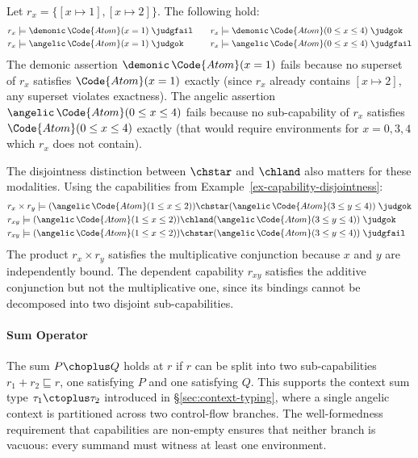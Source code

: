 \begin{example}\label{ex-approximation-modalities}
  Let $r_x = \{[x \mapsto 1], [x \mapsto 2]\}$.  The following hold:
  \begin{align*}
    &r_x \models \demonic\,\Code{Atom}(x = 1) \;\judgfail \quad
    &&r_x \models \demonic\,\Code{Atom}(0 \leq x \leq 4) \;\judgok \\
    &r_x \models \angelic\,\Code{Atom}(x = 1) \;\judgok \quad
    &&r_x \models \angelic\,\Code{Atom}(0 \leq x \leq 4) \;\judgfail
  \end{align*}
  The demonic assertion $\demonic\,\Code{Atom}(x = 1)$ fails because
  no superset of $r_x$ satisfies $\Code{Atom}(x = 1)$ exactly (since
  $r_x$ already contains $[x \mapsto 2]$, any superset violates
  exactness).  The angelic assertion $\angelic\,\Code{Atom}(0 \leq x
  \leq 4)$ fails because no sub-capability of $r_x$ satisfies
  $\Code{Atom}(0 \leq x \leq 4)$ exactly (that would require
  environments for $x = 0, 3, 4$ which $r_x$ does not contain).

  The disjointness distinction between $\chstar$ and $\chland$ also
  matters for these modalities.  Using the capabilities from
  Example~\ref{ex-capability-disjointness}:
  \begin{align*}
    &r_x \times r_y \models (\angelic\,\Code{Atom}(1 \leq x \leq 2)) \chstar (\angelic\,\Code{Atom}(3 \leq y \leq 4)) \;\judgok \\
    &r_{xy} \models (\angelic\,\Code{Atom}(1 \leq x \leq 2)) \chland (\angelic\,\Code{Atom}(3 \leq y \leq 4)) \;\judgok \\
    &r_{xy} \models (\angelic\,\Code{Atom}(1 \leq x \leq 2)) \chstar (\angelic\,\Code{Atom}(3 \leq y \leq 4)) \;\judgfail
  \end{align*}
  The product $r_x \times r_y$ satisfies the multiplicative
  conjunction because $x$ and $y$ are independently bound.  The
  dependent capability $r_{xy}$ satisfies the additive conjunction but
  not the multiplicative one, since its bindings cannot be decomposed
  into two disjoint sub-capabilities.
\end{example}

\paragraph{Sum Operator}
The sum $P \choplus Q$ holds at $r$ if $r$ can be split into two
sub-capabilities $r_1 + r_2 \sqsubseteq r$, one satisfying $P$ and
one satisfying $Q$.  This supports the context sum type $\tau_1
\ctoplus \tau_2$ introduced in \S\ref{sec:context-typing}, where a
single angelic context is partitioned across two control-flow branches.
The well-formedness requirement that capabilities are non-empty ensures
that neither branch is vacuous: every summand must witness at least one
environment.

